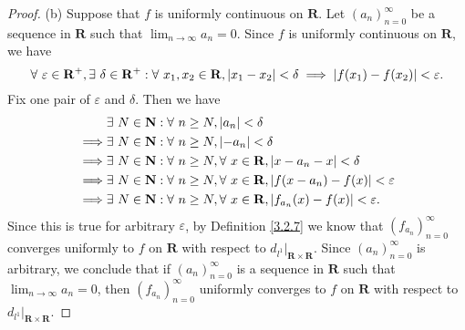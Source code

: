 \begin{proof}{(b)}
    Suppose that \(f\) is uniformly continuous on \(\mathbf{R}\).
    Let \((a_n)_{n = 0}^\infty\) be a sequence in \(\mathbf{R}\) such that \(\lim_{n \to \infty} a_n = 0\).
    Since \(f\) is uniformly continuous on \(\mathbf{R}\), we have
    \[
        \forall\ \varepsilon \in \mathbf{R}^+, \exists\ \delta \in \mathbf{R}^+ : \forall\ x_1, x_2 \in \mathbf{R}, \abs*{x_1 - x_2} < \delta \implies \abs*{f(x_1) - f(x_2)} < \varepsilon.
    \]
    Fix one pair of \(\varepsilon\) and \(\delta\).
    Then we have
    \begin{align*}
                 & \exists\ N \in \mathbf{N} : \forall\ n \geq N, \abs*{a_n} < \delta                                                \\
        \implies & \exists\ N \in \mathbf{N} : \forall\ n \geq N, \abs*{-a_n} < \delta                                               \\
        \implies & \exists\ N \in \mathbf{N} : \forall\ n \geq N, \forall\ x \in \mathbf{R}, \abs*{x - a_n - x} < \delta             \\
        \implies & \exists\ N \in \mathbf{N} : \forall\ n \geq N, \forall\ x \in \mathbf{R}, \abs*{f(x - a_n) - f(x)} < \varepsilon  \\
        \implies & \exists\ N \in \mathbf{N} : \forall\ n \geq N, \forall\ x \in \mathbf{R}, \abs*{f_{a_n}(x) - f(x)} < \varepsilon.
    \end{align*}
    Since this is true for arbitrary \(\varepsilon\), by Definition \ref{3.2.7} we know that \((f_{a_n})_{n = 0}^\infty\) converges uniformly to \(f\) on \(\mathbf{R}\) with respect to \(d_{l^1}|_{\mathbf{R} \times \mathbf{R}}\).
    Since \((a_n)_{n = 0}^\infty\) is arbitrary, we conclude that if \((a_n)_{n = 0}^\infty\) is a sequence in \(\mathbf{R}\) such that \(\lim_{n \to \infty} a_n = 0\), then \((f_{a_n})_{n = 0}^\infty\) uniformly converges to \(f\) on \(\mathbf{R}\) with respect to \(d_{l^1}|_{\mathbf{R} \times \mathbf{R}}\).


\end{proof}
